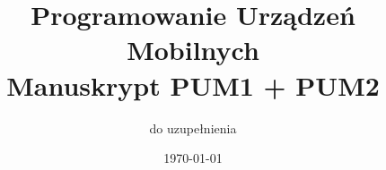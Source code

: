 \documentclass[12pt,a4paper]{book}
\begin{document}
\frontmatter
\title{Programowanie Urządzeń Mobilnych\\Manuskrypt PUM1 + PUM2}
\author{do uzupełnienia}
\date{\today}
\maketitle

\tableofcontents

\mainmatter





\backmatter
\printbibliography
\end{document}
